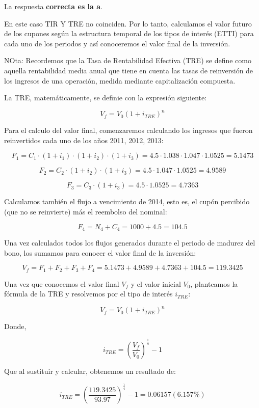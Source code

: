 \documentclass[
  letterpaper,
  DIV=11,
  numbers=noendperiod]{scrreprt}
\begin{document}
\begin{tcolorbox}[enhanced jigsaw, left=2mm, opacityback=0, colback=white, breakable, arc=.35mm, bottomrule=.15mm, rightrule=.15mm, toprule=.15mm, leftrule=.75mm, colframe=quarto-callout-tip-color-frame]
\begin{minipage}[t]{5.5mm}
\textcolor{quarto-callout-tip-color}{\faLightbulb}
\end{minipage}%
\begin{minipage}[t]{\textwidth - 5.5mm}

La respuesta \textbf{correcta es la a}.

En este caso TIR Y TRE no coinciden. Por lo tanto, calculamos el valor
futuro de los cupones según la estructura temporal de los tipos de
interés (ETTI) para cada uno de los periodos y así conoceremos el valor
final de la inversión.

NOta: Recordemos que la Tasa de Rentabilidad Efectiva (TRE) se define
como aquella rentabilidad media anual que tiene en cuenta las tasas de
reinversión de los ingresos de una operación, medida mediante
capitalización compuesta.

La TRE, matemáticamente, se definie con la expresión siguiente:

\[V_f=V_0\left(1+i_{TRE}\right)^n\]

Para el calculo del valor final, comenzaremos calculando los ingresos
que fueron reinvertidos cada uno de los años 2011, 2012, 2013:

\[F_1=C_1\cdot\left(1+i_1\right)\cdot\left(1+i_2\right)\cdot\left(1+i_3\right)=4.5\cdot1.038\cdot1.047\cdot1.0525=5.1473\]

\[F_2=C_2\cdot\left(1+i_2\right)\cdot\left(1+i_3\right)=4.5\cdot1.047\cdot1.0525=4.9589\]

\[F_3=C_3\cdot\left(1+i_3\right)=4.5\cdot1.0525=4.7363\]

Calculamos también el flujo a vencimiento de 2014, esto es, el cupón
percibido (que no se reinvierte) más el reembolso del nominal:

\[F_4=N_4+C_4=1000+4.5=104.5\]

Una vez calculados todos los flujos generados durante el periodo de
madurez del bono, los sumamos para conocer el valor final de la
inversión:

\[V_f=F_1+F_2+F_3+F_4=5.1473+4.9589+4.7363+104.5=119.3425\]

Una vez que conocemos el valor final \(V_f\) y el valor inicial \(V_0\),
planteamos la fórmula de la TRE y resolvemos por el tipo de interés
\(i_{TRE}\):

\[V_f=V_0\left(1+i_{TRE}\right)^n\]

Donde,

\[i_{TRE}=\left(\frac{V_f }{V_0 }\right)^{\frac{1 }{n }}-1\]

Que al sustituir y calcular, obtenemos un resultado de:

\[i_{TRE}=\left(\frac{ 119.3425}{93.97 }\right)^{\frac{1 }{4 }}-1=0.06157(6.157\%)\]

\end{minipage}%
\end{tcolorbox}
\end{document}
